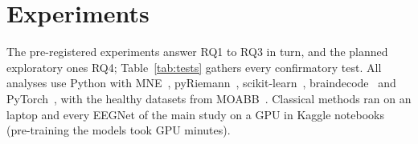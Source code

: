 \section{Experiments}
\label{sec:exp}

The pre-registered experiments answer RQ1 to RQ3 in turn, and the planned exploratory ones RQ4;
Table~\ref{tab:tests} gathers every confirmatory test. All analyses use Python with
MNE~\cite{gramfort2013}, pyRiemann~\cite{pyriemann}, scikit-learn~\cite{pedregosa2011},
braindecode~\cite{braindecode} and PyTorch~\cite{paszke2019}, with the healthy datasets from
MOABB~\cite{jayaram2018moabb}. Classical methods ran on an \demoInferenceMachine{} laptop and
every EEGNet of the main study on a \dlPretrainDevice{} GPU in Kaggle notebooks (pre-training the
\dlPretrainModels{} models took \dlPretrainMinutes{} GPU minutes).

